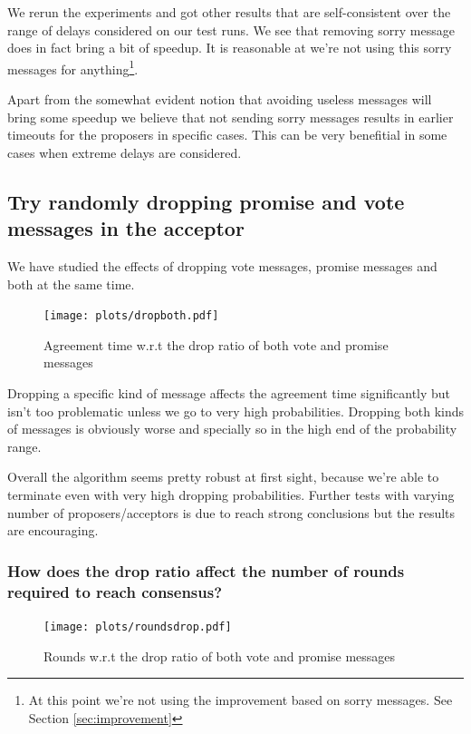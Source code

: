 \documentclass[a4paper, 10pt]{article}
\begin{document}
We rerun the experiments and got other results that are self-consistent over the range of delays considered on our test runs. We see that removing sorry message does in fact bring a bit of speedup. It is reasonable at we're not using this sorry messages for anything\footnote{At this point we're not using the improvement based on sorry messages. See Section \ref{sec:improvement}}.


Apart from the somewhat evident notion that avoiding useless messages will bring some speedup 
we believe that not sending sorry messages results in earlier timeouts for the proposers in 
specific cases. This can be very benefitial in some cases when extreme delays are considered.



\clearpage

\subsection{Try randomly dropping promise and vote messages in the acceptor}

We have studied the effects of dropping vote messages, promise messages and both at the same
time.

\begin{figure}[H]
  \centering
  \texttt{[image: plots/dropboth.pdf]}
    \caption{Agreement time w.r.t the drop ratio of both vote and promise messages}
\end{figure} 

Dropping a specific kind of message affects the agreement time significantly but isn't too
problematic unless we go to very high probabilities. Dropping both kinds of messages is obviously worse and specially so in the high end of the probability range.

Overall the algorithm seems pretty robust at first sight, because we're able to terminate even with very high dropping probabilities. Further tests with varying number of proposers/acceptors is due to reach strong conclusions but the results are encouraging.


\subsubsection{How does the drop ratio affect the number of rounds required to reach consensus?}
\begin{figure}[H]
  \centering
  \texttt{[image: plots/roundsdrop.pdf]}
    \caption{Rounds w.r.t the drop ratio of both vote and promise messages}
\end{figure} 
\end{document}
